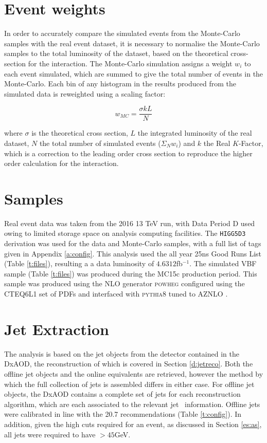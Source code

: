 	\section{Event weights}

		 In order to accurately compare the simulated events from the Monte-Carlo samples with the real event dataset, it is necessary to normalise the Monte-Carlo samples to the total luminosity of the dataset, based on the theoretical cross-section for the interaction. The Monte-Carlo simulation assigns a weight $w_i$ to each event simulated, which are summed to give the total number of events in the Monte-Carlo. Each bin of any histogram in the results produced from the simulated data is reweighted using a scaling factor:

		 \begin{equation}
		 w_{MC} = \frac{\sigma k L}{N}
		 \end{equation}

		 where $\sigma$ is the theoretical cross section, $L$ the integrated luminosity of the real dataset, $N$ the total number of simulated events ($\Sigma_N w_i$) and $k$ the Real $K$-Factor, which is a correction to the leading order cross section to reproduce the higher order calculation for the interaction.


	\section{Samples}
		 Real event data was taken from the 2016 13 TeV run, with Data Period D used owing to limited storage space on analysis computing facilities. The \texttt{HIGG5D3} derivation was used for the data and Monte-Carlo samples, with a full list of tags given in Appendix \ref{a:config}. This analysis used the all year 25ns Good Runs List (Table \ref{t:files}), resulting a a data luminosity of $4.6312$fb$^{-1}$. The simulated VBF sample (Table \ref{t:files}) was produced during the MC15c production period. This sample was produced using the NLO generator \textsc{powheg} configured using the CTEQ6L1 \cite{CTEQ} set of PDFs and interfaced with \textsc{pythia8} tuned to AZNLO \cite{AZNLO}.

	\section{Jet Extraction}

		The analysis is based on the jet objects from the detector contained in the DxAOD, the reconstruction of which is covered in Section \ref{d:jetreco}. Both the offline jet objects and the online equivalents are retrieved, however the method by which the full collection of jets is assembled differs in either case. For offline jet objects, the DxAOD contains a complete set of jets for each reconstruction algorithm, which are each associated to the relevant jet \btag\, information. Offline jets were calibrated in line with the 20.7 recommendations (Table \ref{t:config}). In addition, given the high \pt cuts required for an event, as discussed in Section \ref{es:as}, all jets were required to have \pt$>45$GeV.

